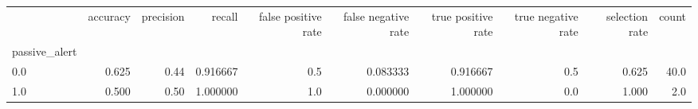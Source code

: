 \begin{tabular}{lrrrrrrrrr}
\toprule
{} &  accuracy &  precision &    recall &  false positive rate &  false negative rate &  true positive rate &  true negative rate &  selection rate &  count \\
passive\_alert &           &            &           &                      &                      &                     &                     &                 &        \\
\midrule
0.0           &     0.625 &       0.44 &  0.916667 &                  0.5 &             0.083333 &            0.916667 &                 0.5 &           0.625 &   40.0 \\
1.0           &     0.500 &       0.50 &  1.000000 &                  1.0 &             0.000000 &            1.000000 &                 0.0 &           1.000 &    2.0 \\
\bottomrule
\end{tabular}
